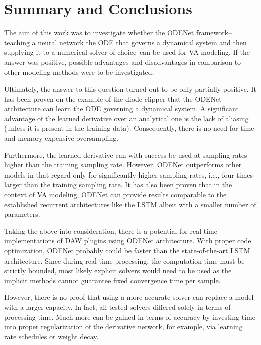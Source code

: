 \chapter{Summary and Conclusions}
\label{chapter:conclusions}

The aim of this work was to investigate whether the ODENet framework--teaching a neural network the \acl{ODE} that governs a dynamical system and then supplying it to a numerical solver of choice--can be used for \acl{VA} modeling. If the answer was positive, possible advantages and disadvantages in comparison to other modeling methods were to be investigated.

Ultimately, the answer to this question turned out to be only partially positive. It has been proven on the example of the diode clipper that the ODENet architecture can learn the \ac{ODE} governing a dynamical system. A significant advantage of the learned derivative over an analytical one is the lack of aliasing (unless it is present in the training data). Consequently, there is no need for time- and memory-expensive oversampling.

Furthermore, the learned derivative can with success be used at sampling rates higher than the training sampling rate. However, ODENet outperforms other models in that regard only for significantly higher sampling rates, i.e., four times larger than the training sampling rate. It has also been proven that in the context of \ac{VA} modeling, ODENet can provide results comparable to the established recurrent architectures like the \ac{LSTM} albeit with a smaller number of parameters.

Taking the above into consideration, there is a potential for real-time implementations of \ac{DAW} plugins using ODENet architecture. With proper code optimization, ODENet probably could be faster than the state-of-the-art \ac{LSTM} architecture. Since during real-time processing, the computation time must be strictly bounded, most likely explicit solvers would need to be used as the implicit methods cannot guarantee fixed convergence time per sample.

However, there is no proof that using a more accurate solver can replace a model with a larger capacity. In fact, all tested solvers differed solely in terms of processing time. Much more can be gained in terms of accuracy by investing time into proper regularization of the derivative network, for example, via learning rate schedules or weight decay.

